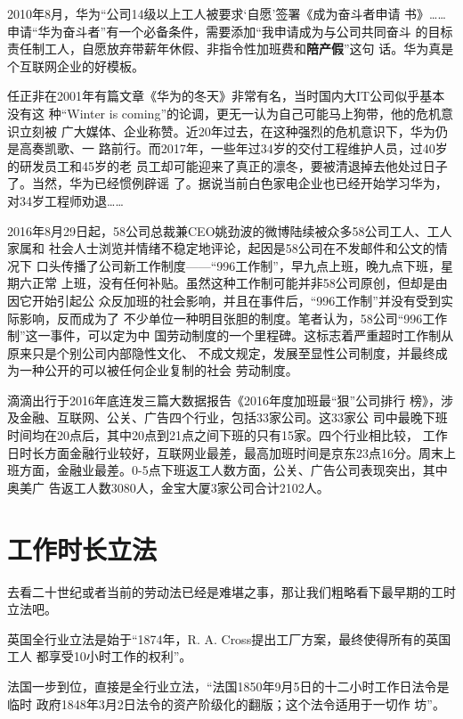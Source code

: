 2010年8月，华为“公司14级以上工人被要求`自愿'签署《成为奋斗者申请
书》……申请“华为奋斗者”有一个必备条件，需要添加“我申请成为与公司共同奋斗
的目标责任制工人，自愿放弃带薪年休假、非指令性加班费和\textbf{陪产假}”这句
话。\cite{huaweifendou}华为真是个互联网企业的好模板。

任正非在2001年有篇文章《华为的冬天》非常有名，当时国内大IT公司似乎基本没有这
种“Winter is coming”的论调，更无一认为自己可能马上狗带，他的危机意识立刻被
广大媒体、企业称赞。近20年过去，在这种强烈的危机意识下，华为仍是高奏凯歌、一
路前行。而2017年，一些年过34岁的交付工程维护人员，过40岁的研发员工和45岁的老
员工却可能迎来了真正的凛冬，要被清退掉去他处过日子了。当然，华为已经惯例辟谣
了。据说当前白色家电企业也已经开始学习华为，对34岁工程师劝退……

2016年8月29日起，58公司总裁兼CEO姚劲波的微博陆续被众多58公司工人、工人家属和
社会人士浏览并情绪不稳定地评论\cite{tai58}，起因是58公司在不发邮件和公文的情况下
口头传播了公司新工作制度——“996工作制”，早九点上班，晚九点下班，星期六正常
上班，没有任何补贴。虽然这种工作制可能并非58公司原创，但却是由因它开始引起公
众反加班的社会影响，并且在事件后，“996工作制”并没有受到实际影响，反而成为了
不少单位一种明目张胆的制度。笔者认为，58公司“996工作制”这一事件，可以定为中
国劳动制度的一个里程碑。这标志着严重超时工作制从原来只是个别公司内部隐性文化、
不成文规定，发展至显性公司制度，并最终成为一种公开的可以被任何企业复制的社会
劳动制度。

滴滴出行于2016年底连发三篇大数据报告《2016年度加班最“狠”公司排行
榜》\cite{zuihen}，涉及金融、互联网、公关、广告四个行业，包括33家公司。这33家公
司中最晚下班时间均在20点后，其中20点到21点之间下班的只有15家。四个行业相比较，
工作日时长方面金融行业较好，互联网业最差，最高加班时间是京东23点16分。周末上
班方面，金融业最差。0-5点下班返工人数方面，公关、广告公司表现突出，其中奥美广
告返工人数3080人，金宝大厦3家公司合计2102人。

\section{工作时长立法}

去看二十世纪或者当前的劳动法已经是难堪之事，那让我们粗略看下最早期的工时立法吧。

英国全行业立法是始于“1874年，R. A. Cross提出工厂方案，最终使得所有的英国工人
都享受10小时工作的权利”。

法国一步到位，直接是全行业立法，“法国1850年9月5日的十二小时工作日法令是临时
政府1848年3月2日法令的资产阶级化的翻版；这个法令适用于一切作
坊”。

